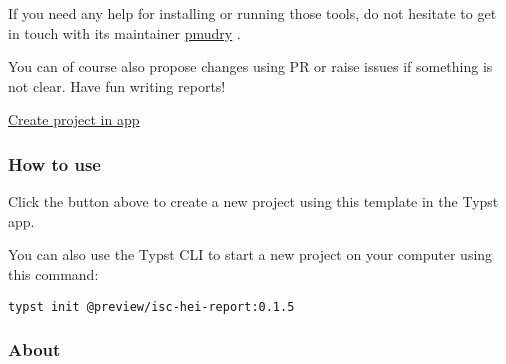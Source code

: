 If you need any help for installing or running those tools, do not
hesitate to get in touch with its maintainer
\href{https://github.com/pmudry}{pmudry} .

You can of course also propose changes using PR or raise issues if
something is not clear. Have fun writing reports!

\href{/app?template=isc-hei-report&version=0.1.5}{Create project in app}

\subsubsection{How to use}\label{how-to-use}

Click the button above to create a new project using this template in
the Typst app.

You can also use the Typst CLI to start a new project on your computer
using this command:

\begin{verbatim}
typst init @preview/isc-hei-report:0.1.5
\end{verbatim}



\subsubsection{About}\label{about}

